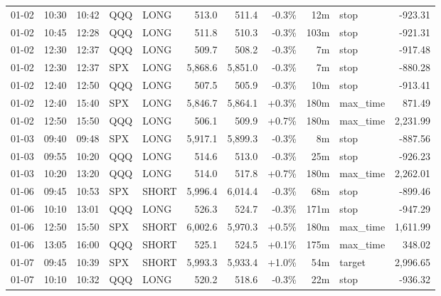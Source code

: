 \documentclass[11pt,a4paper,twoside]{article}
\begin{document}
\begin{center}
\begin{longtable}{>{\color{txtmain}}l l l l l r r r r >{\color{txtmain}}l r}
01-02 & 10:30 & 10:42 & QQQ & LONG & 513.0 & 511.4 & \textcolor{lossred}{-0.3\%} & 12m & stop & \textcolor{lossred}{-923.31} \\
01-02 & 10:45 & 12:28 & QQQ & LONG & 511.8 & 510.3 & \textcolor{lossred}{-0.3\%} & 103m & stop & \textcolor{lossred}{-921.31} \\
01-02 & 12:30 & 12:37 & QQQ & LONG & 509.7 & 508.2 & \textcolor{lossred}{-0.3\%} & 7m & stop & \textcolor{lossred}{-917.48} \\
01-02 & 12:30 & 12:37 & SPX & LONG & 5,868.6 & 5,851.0 & \textcolor{lossred}{-0.3\%} & 7m & stop & \textcolor{lossred}{-880.28} \\
01-02 & 12:40 & 12:50 & QQQ & LONG & 507.5 & 505.9 & \textcolor{lossred}{-0.3\%} & 10m & stop & \textcolor{lossred}{-913.41} \\
01-02 & 12:40 & 15:40 & SPX & LONG & 5,846.7 & 5,864.1 & \textcolor{wingreen}{+0.3\%} & 180m & max\_time & \textcolor{wingreen}{871.49} \\
01-02 & 12:50 & 15:50 & QQQ & LONG & 506.1 & 509.9 & \textcolor{wingreen}{+0.7\%} & 180m & max\_time & \textcolor{wingreen}{2,231.99} \\
01-03 & 09:40 & 09:48 & SPX & LONG & 5,917.1 & 5,899.3 & \textcolor{lossred}{-0.3\%} & 8m & stop & \textcolor{lossred}{-887.56} \\
01-03 & 09:55 & 10:20 & QQQ & LONG & 514.6 & 513.0 & \textcolor{lossred}{-0.3\%} & 25m & stop & \textcolor{lossred}{-926.23} \\
01-03 & 10:20 & 13:20 & QQQ & LONG & 514.0 & 517.8 & \textcolor{wingreen}{+0.7\%} & 180m & max\_time & \textcolor{wingreen}{2,262.01} \\
01-06 & 09:45 & 10:53 & SPX & SHORT & 5,996.4 & 6,014.4 & \textcolor{lossred}{-0.3\%} & 68m & stop & \textcolor{lossred}{-899.46} \\
01-06 & 10:10 & 13:01 & QQQ & LONG & 526.3 & 524.7 & \textcolor{lossred}{-0.3\%} & 171m & stop & \textcolor{lossred}{-947.29} \\
01-06 & 12:50 & 15:50 & SPX & SHORT & 6,002.6 & 5,970.3 & \textcolor{wingreen}{+0.5\%} & 180m & max\_time & \textcolor{wingreen}{1,611.99} \\
01-06 & 13:05 & 16:00 & QQQ & SHORT & 525.1 & 524.5 & \textcolor{wingreen}{+0.1\%} & 175m & max\_time & \textcolor{wingreen}{348.02} \\
01-07 & 09:45 & 10:39 & SPX & SHORT & 5,993.3 & 5,933.4 & \textcolor{wingreen}{+1.0\%} & 54m & target & \textcolor{wingreen}{2,996.65} \\
01-07 & 10:10 & 10:32 & QQQ & LONG & 520.2 & 518.6 & \textcolor{lossred}{-0.3\%} & 22m & stop & \textcolor{lossred}{-936.32} \\

\end{longtable}
\end{center}
\end{document}
